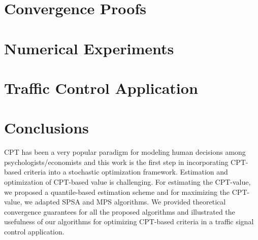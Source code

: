 \documentclass[twocolumn]{IEEEtran}
\begin{document}
\section{Convergence Proofs}
\label{sec:convergence}

\section{Numerical Experiments}
\label{sec:expts-simple}


\section{Traffic Control Application}
\label{sec:expts}





\section{Conclusions}
\label{sec:conclusions}
CPT has been a very popular paradigm for modeling human decisions among psychologists/economists and this work is the first step in incorporating CPT-based criteria into a stochastic optimization framework. Estimation and optimization of CPT-based value is challenging. 
For estimating the CPT-value, we proposed a quantile-based estimation scheme and for maximizing the CPT-value, we adapted SPSA \cite{spall} and MPS \cite{chang2013simulation} algorithms. 
We provided theoretical convergence guarantees for all the proposed algorithms and illustrated the usefulness of our algorithms for optimizing CPT-based criteria in a traffic signal control application.



%





%
\end{document}
